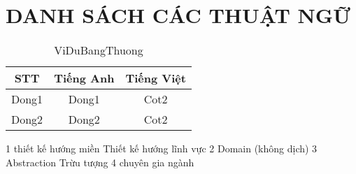 \newpage
\section*{\centering       DANH SÁCH CÁC THUẬT NGỮ}










\begin{table}[h]
    \centering
    \begin{tabular}{|c|c|c|}
        \hline
        STT   & Tiếng Anh & Tiếng Việt \\
        \hline
        Dong1 & Dong1       & Cot2  \\
        \hline
        Dong2 & Dong2       & Cot2  \\
        \hline
    \end{tabular}
    \caption{ViDuBangThuong}
\end{table} 




\newpage

 


1 thiết kế hướng miền
Thiết kế hướng lĩnh vực
2 Domain (không dịch)
3 Abstraction Trừu tượng
4 chuyên gia ngành